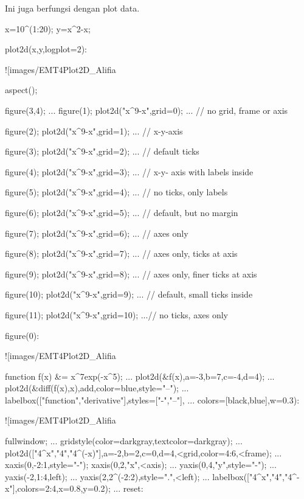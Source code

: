 \documentclass{article}
\begin{document}
Ini juga berfungsi dengan plot data.


\>x=10^(1:20); y=x^2-x;

\>plot2d(x,y,logplot=2):


![images/EMT4Plot2D_Alifia%

\>aspect();

\>figure(3,4); ...  
\>    figure(1); plot2d("x^9-x",grid=0); ... // no grid, frame or axis

\> figure(2); plot2d("x^9-x",grid=1); ... // x-y-axis

\> figure(3); plot2d("x^9-x",grid=2); ... // default ticks

\> figure(4); plot2d("x^9-x",grid=3); ... // x-y- axis with labels inside

\> figure(5); plot2d("x^9-x",grid=4); ... // no ticks, only labels

\> figure(6); plot2d("x^9-x",grid=5); ... // default, but no margin

\> figure(7); plot2d("x^9-x",grid=6); ... // axes only

\> figure(8); plot2d("x^9-x",grid=7); ... // axes only, ticks at axis

\> figure(9); plot2d("x^9-x",grid=8); ... // axes only, finer ticks at axis

\> figure(10); plot2d("x^9-x",grid=9); ... // default, small ticks inside

\> figure(11); plot2d("x^9-x",grid=10); ...// no ticks, axes only

\> figure(0):


![images/EMT4Plot2D_Alifia%

\>function f(x) &= x^7\*exp(-x^5);  ...  
\>   plot2d(&f(x),a=-3,b=7,c=-4,d=4);  ...  
\>   plot2d(&diff(f(x),x),\>add,color=blue,style="--"); ...  
\>   labelbox(["function","derivative"],styles=["-","--"], ...  
\>      colors=[black,blue],w=0.3):


![images/EMT4Plot2D_Alifia%

\>fullwindow; ...  
\>    gridstyle(color=darkgray,textcolor=darkgray); ...  
\>    plot2d(["4^x","4","4^(-x)"],a=-2,b=2,c=0,d=4,<grid,color=4:6,<frame); ...  
\>    xaxis(0,-2:1,style="-\>"); xaxis(0,2,"x",<axis); ...  
\>    yaxis(0,4,"y",style="-\>"); ...  
\>    yaxis(-2,1:4,\>left); ...  
\>    yaxis(2,2^(-2:2),style=".",<left); ...  
\>    labelbox(["4^x","4","4^-x"],colors=2:4,x=0.8,y=0.2); ...  
\>    reset:
\end{document}
